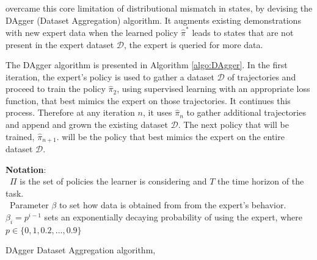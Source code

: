 \documentclass{article}
\begin{document}
\cite{Dagger-Ross2010} overcame this core limitation of distributional mismatch in states, by devising the DAgger (Dataset Aggregation) algorithm. It augments existing demonstrations with new expert data when the learned policy ${\hat{\pi}}^*$ leads to states that are not present in the expert dataset $\mathcal{D}$, the expert is queried for more data.

The DAgger algorithm is presented in Algorithm \ref{algo:DAgger}. In the first iteration, the expert's policy is used to gather a dataset $\mathcal{D}$ of trajectories and proceed to train the policy $\hat{\pi}_2$, using supervised learning with an appropriate loss function, that best mimics the expert on those trajectories. It continues this process. Therefore at any iteration $n$, it uses $\hat{\pi}_n$ to gather additional trajectories and append and grown the existing dataset $\mathcal{D}$. The next policy that will be trained, $\hat{\pi}_{n+1}$. will be the policy that best mimics the expert on the entire dataset $\mathcal{D}$.

\noindent \textbf{Notation}:\\
\textbullet\ \quad $\Pi$ is the set of policies the learner is considering and $T$ the time horizon of the task.\\
\textbullet\ \quad Parameter $\beta$ to set how data is obtained from from the expert's behavior. $\beta_i = p^{i-1}$ sets an exponentially decaying probability of using the expert, where $p \in \{0,1, 0.2, ..., 0.9\}$\\

\begin{algorithm}
\onehalfspacing
\caption{DAgger Dataset Aggregation algorithm, \citep{Dagger-Ross2010}}\label{algo:DAgger}
\begin{algorithmic}[1]
	\EndFor
\end{algorithmic} 
\end{algorithm}
\end{document}
